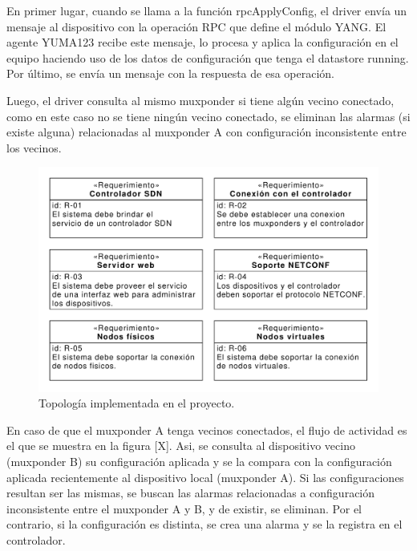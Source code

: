   En primer lugar, cuando se llama a la función rpcApplyConfig, el driver envía un mensaje al dispositivo con la operación RPC que define el módulo YANG. El agente YUMA123 recibe este mensaje, lo procesa y aplica la configuración en el equipo haciendo uso de los datos de configuración que tenga el datastore running. Por último, se envía un mensaje con la respuesta de esa operación. 

  Luego, el driver consulta al mismo muxponder si tiene algún vecino conectado, como en este caso no se tiene ningún vecino conectado, se eliminan las alarmas (si existe alguna) relacionadas al muxponder A con configuración inconsistente entre los vecinos.

  \begin{figure}[H]
    \centering
    \includegraphics[scale=0.65]{Figures/req_sys.pdf}
    \caption{Topología implementada en el proyecto.}
    \label{fig:req_sys}
  \end{figure}

  En caso de que el muxponder A tenga vecinos conectados, el flujo de actividad es el que se muestra en la figura [X]. Asi, se consulta al dispositivo vecino (muxponder B) su configuración aplicada y se la compara con la configuración aplicada recientemente al dispositivo local (muxponder A). Si las configuraciones resultan ser las mismas, se buscan las alarmas relacionadas a configuración inconsistente entre el muxponder A y B, y de existir, se eliminan. Por el contrario, si la configuración es distinta, se crea una alarma y se la registra en el controlador.

